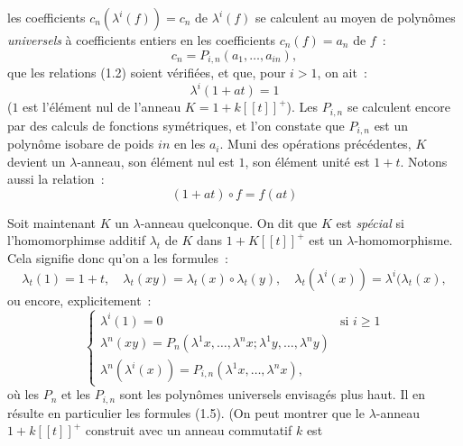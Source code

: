 les
coefficients $c_n(\lambda^i(f))=c_n\text{ de }\lambda^i(f)$ se calculent au moyen de polynômes \emph{universels} à coefficients entiers en les coefficients $c_n(f)=a_n$ de $f$~:
\begin{equation}\tag{1.8}
c_n=P_{i,n}(a_1,\ldots,a_{in}),
\end{equation}
que les relations (1.2) soient vérifiées, et que, pour $i>1$, on ait~:
\begin{equation}\tag{1.9}
\lambda^i(1+at)=1
\end{equation}
($1$ est l'élément nul de l'anneau $K=1+k[[t]]^+$). Les $P_{i,n}$ se calculent encore par des calculs de fonctions symétriques, et l'on constate que $P_{i,n}$ est un polynôme isobare de poids $in$ en les $a_i$. Muni des opérations précédentes, $K$ devient un $\lambda$-anneau, son élément nul est $1$, son élément unité est $1+t$. Notons aussi la relation~:
\begin{equation}\tag{1.7 bis}
(1+at)\circ f=f(at)
\end{equation}

Soit maintenant $K$ un $\lambda$-anneau quelconque. On dit que $K$ est \emph{spécial} si l'homomorphimse additif $\lambda_t$ de $K$ dans $1+K[[t]]^+$ est un $\lambda$-homomorphisme. Cela signifie donc qu'on a les formules~:
\begin{equation}\tag{1.10}
\lambda_t(1)=1+t,\quad
\lambda_t(xy)=\lambda_t(x)\circ\lambda_t(y),\quad
\lambda_t(\lambda^i(x))=\lambda^i(\lambda_t(x),
\end{equation}
ou encore, explicitement~:
\begin{equation}\tag{1.11}
\begin{cases}
\lambda^i(1)=0 & \text{si }i\geq 1\\
\lambda^n(xy)=P_n(\lambda^1x,\ldots,\lambda^n x;\lambda^1y,\ldots,\lambda^n y)\\
\lambda^n(\lambda^i(x))=P_{i,n}(\lambda^1x,\ldots,\lambda^n x),
\end{cases}
\end{equation}
où les $P_n$ et les $P_{i,n}$ sont les polynômes universels envisagés plus haut. Il en résulte en particulier les formules (1.5). (On peut montrer que le $\lambda$-anneau $1+k[[t]]^+$ construit avec un anneau commutatif $k$ est
